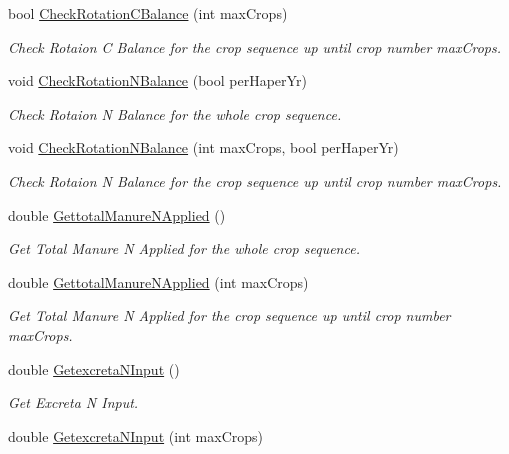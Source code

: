 \begin{DoxyCompactItemize}
bool \mbox{\hyperlink{class_crop_sequence_class_a5099fe7283418a6962e9ae4d69200543}{Check\+Rotation\+C\+Balance}} (int max\+Crops)
\begin{DoxyCompactList}\small\item\em Check Rotaion C Balance for the crop sequence up until crop number max\+Crops. \end{DoxyCompactList}\item 
void \mbox{\hyperlink{class_crop_sequence_class_a493356e22d3b83da02f2df0ff571c6ab}{Check\+Rotation\+N\+Balance}} (bool per\+Haper\+Yr)
\begin{DoxyCompactList}\small\item\em Check Rotaion N Balance for the whole crop sequence. \end{DoxyCompactList}\item 
void \mbox{\hyperlink{class_crop_sequence_class_aa078d5e9470d8f731d42275788fdf3d4}{Check\+Rotation\+N\+Balance}} (int max\+Crops, bool per\+Haper\+Yr)
\begin{DoxyCompactList}\small\item\em Check Rotaion N Balance for the crop sequence up until crop number max\+Crops. \end{DoxyCompactList}\item 
double \mbox{\hyperlink{class_crop_sequence_class_a01abdbc3d224f97bd267ce249dabb2c6}{Gettotal\+Manure\+N\+Applied}} ()
\begin{DoxyCompactList}\small\item\em Get Total Manure N Applied for the whole crop sequence. \end{DoxyCompactList}\item 
double \mbox{\hyperlink{class_crop_sequence_class_a60c079f8e1a758f2bd4f6124dd7acfcc}{Gettotal\+Manure\+N\+Applied}} (int max\+Crops)
\begin{DoxyCompactList}\small\item\em Get Total Manure N Applied for the crop sequence up until crop number max\+Crops. \end{DoxyCompactList}\item 
double \mbox{\hyperlink{class_crop_sequence_class_a6796771f354e44de318c5801a1842285}{Getexcreta\+N\+Input}} ()
\begin{DoxyCompactList}\small\item\em Get Excreta N Input. \end{DoxyCompactList}\item 
double \mbox{\hyperlink{class_crop_sequence_class_a93532b6d911e7ca60382fc1b56262bad}{Getexcreta\+N\+Input}} (int max\+Crops)

\end{DoxyCompactItemize}
